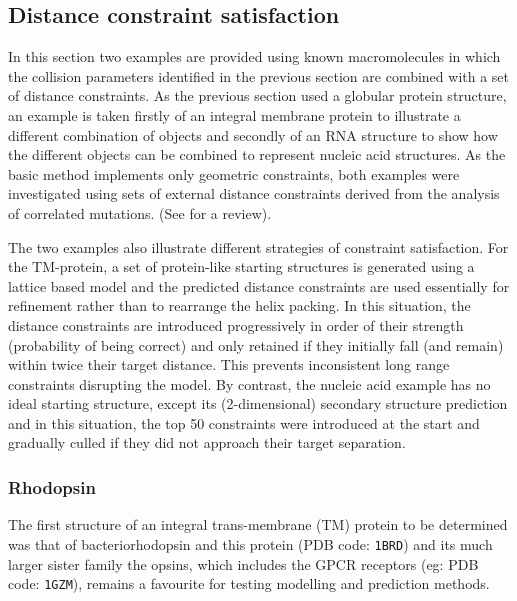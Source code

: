 \subsection{Distance constraint satisfaction}

In this section two examples are provided using known macromolecules in
which the collision parameters identified in the previous section are
combined with a set of distance constraints.
As the previous section used a globular protein structure, an example is
taken firstly of an integral membrane protein to illustrate a different 
combination of objects and secondly of an RNA structure to show how the
different objects can be combined to represent nucleic acid structures.
As the basic method implements only geometric constraints, both examples
were investigated using sets of external distance constraints derived from
the analysis of correlated mutations.  (See \cite{TaylorWRet13} for a review).

The two examples also illustrate different strategies of constraint
satisfaction.   For the TM-protein, a set of protein-like starting 
structures is generated using a lattice based model \cite{TaylorWRet94a} and the
predicted distance constraints are used essentially for refinement rather
than to rearrange the helix packing.  In this situation, the distance
constraints are introduced progressively in order of their strength
(probability of being correct) and only retained if they initially
fall (and remain) within twice their target distance.   This prevents
inconsistent long range constraints disrupting the model.  By contrast,
the nucleic acid example has no ideal starting structure, except its
(2-dimensional) secondary structure prediction and in this situation,
the top 50 constraints were introduced at the start and gradually culled
if they did not approach their target separation.  

\subsubsection{Rhodopsin}

The first structure of an integral trans-membrane (TM) protein to be determined
was that of bacteriorhodopsin and this protein (PDB code: {\tt 1BRD}) and its
much larger sister family the opsins, which includes the GPCR receptors (eg: PDB code:
{\tt 1GZM}), remains a favourite for testing modelling and prediction methods.

